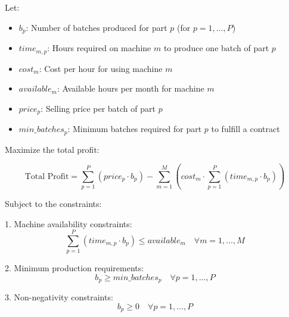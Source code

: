 \documentclass{article}
\begin{document}

Let:
\begin{itemize}
    \item \( b_p \): Number of batches produced for part \( p \) (for \( p = 1, \ldots, P \))
    \item \( time_{m,p} \): Hours required on machine \( m \) to produce one batch of part \( p \)
    \item \( cost_m \): Cost per hour for using machine \( m \)
    \item \( available_m \): Available hours per month for machine \( m \)
    \item \( price_p \): Selling price per batch of part \( p \)
    \item \( min\_batches_p \): Minimum batches required for part \( p \) to fulfill a contract
\end{itemize}

Maximize the total profit:

\[
\text{Total Profit} = \sum_{p=1}^{P} (price_p \cdot b_p) - \sum_{m=1}^{M} \left( cost_m \cdot \sum_{p=1}^{P} (time_{m,p} \cdot b_p) \right)
\]

Subject to the constraints:

1. Machine availability constraints:
\[
\sum_{p=1}^{P} (time_{m,p} \cdot b_p) \leq available_m \quad \forall m = 1, \ldots, M
\]

2. Minimum production requirements:
\[
b_p \geq min\_batches_p \quad \forall p = 1, \ldots, P
\]

3. Non-negativity constraints:
\[
b_p \geq 0 \quad \forall p = 1, \ldots, P
\]
\end{document}
